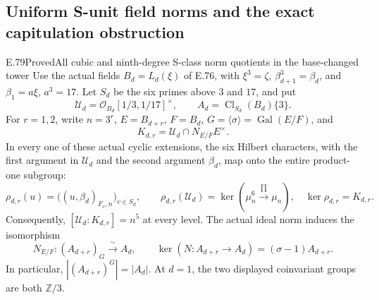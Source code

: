 \subsection{Uniform S-unit field norms and the exact capitulation obstruction}

\begin{statement}{E.79}{Proved}{All cubic and ninth-degree S-class norm quotients in the base-changed tower}
Use the actual fields $B_d=L_d(\xi)$ of E.76, with
$\xi^3=\zeta$, $\beta_{d+1}^3=\beta_d$, and $\beta_1=a\xi$,
$a^3=17$. Let $S_d$ be the six primes above $3$ and $17$, and put
\[
 \mathscr U_d=\mathcal O_{B_d}[1/3,1/17]^\times,
 \qquad A_d=\operatorname{Cl}_{S_d}(B_d)\{3\}.
 \tag{E79.1}
\]
For $r=1,2$, write $n=3^r$, $E=B_{d+r}$, $F=B_d$,
$G=\langle\sigma\rangle=\operatorname{Gal}(E/F)$, and
\[
 K_{d,r}=\mathscr U_d\cap N_{E/F}E^\times.
 \tag{E79.2}
\]
In every one of these actual cyclic extensions, the six Hilbert
characters, with the first argument in $\mathscr U_d$ and the
second argument $\beta_d$, map onto the entire product-one subgroup:
\[
 \rho_{d,r}(u)=\bigl((u,\beta_d)_{F_v,n}\bigr)_{v\in S_d},
 \qquad
 \rho_{d,r}(\mathscr U_d)
   =\ker\!\left(\mu_n^6\xrightarrow{\prod}\mu_n\right),
 \quad \ker\rho_{d,r}=K_{d,r}.
 \tag{E79.3}
\]
Consequently, $[\mathscr U_d:K_{d,r}]=n^5$ at every level.
The actual ideal norm induces the isomorphism
\[
 N_{E/F}: (A_{d+r})_G\xrightarrow{\ \sim\ } A_d,
 \qquad
 \ker(N:A_{d+r}\to A_d)=(\sigma-1)A_{d+r}.
 \tag{E79.4}
\]
In particular,
$|(A_{d+r})^G|=|A_d|$. At $d=1$, the two displayed
coinvariant groups are both $\mathbb Z/3$.


\end{statement}

